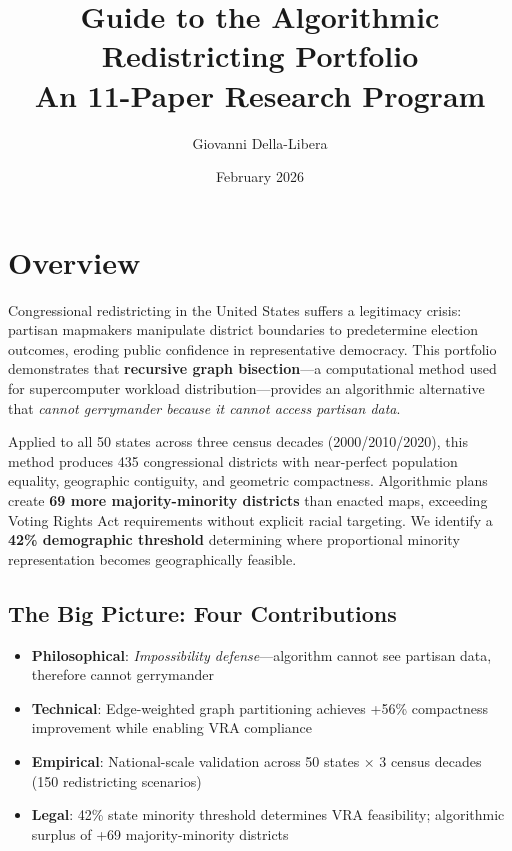 \documentclass[11pt]{article}
\title{\textbf{Guide to the Algorithmic Redistricting Portfolio}\\
\large An 11-Paper Research Program}
\author{Giovanni Della-Libera}
\date{February 2026}
\begin{document}
\maketitle

\section*{Overview}

Congressional redistricting in the United States suffers a legitimacy crisis: partisan mapmakers manipulate district boundaries to predetermine election outcomes, eroding public confidence in representative democracy. This portfolio demonstrates that \textbf{recursive graph bisection}---a computational method used for supercomputer workload distribution---provides an algorithmic alternative that \emph{cannot gerrymander because it cannot access partisan data}.

Applied to all 50 states across three census decades (2000/2010/2020), this method produces 435 congressional districts with near-perfect population equality, geographic contiguity, and geometric compactness. Algorithmic plans create \textbf{69 more majority-minority districts} than enacted maps, exceeding Voting Rights Act requirements without explicit racial targeting. We identify a \textbf{42\% demographic threshold} determining where proportional minority representation becomes geographically feasible.

\subsection*{The Big Picture: Four Contributions}

\begin{itemize}[leftmargin=*,noitemsep,topsep=4pt]
    \item \textbf{Philosophical}: \emph{Impossibility defense}---algorithm cannot see partisan data, therefore cannot gerrymander
    \item \textbf{Technical}: Edge-weighted graph partitioning achieves +56\% compactness improvement while enabling VRA compliance
    \item \textbf{Empirical}: National-scale validation across 50 states × 3 census decades (150 redistricting scenarios)
    \item \textbf{Legal}: 42\% state minority threshold determines VRA feasibility; algorithmic surplus of +69 majority-minority districts
\end{itemize}
\end{document}
